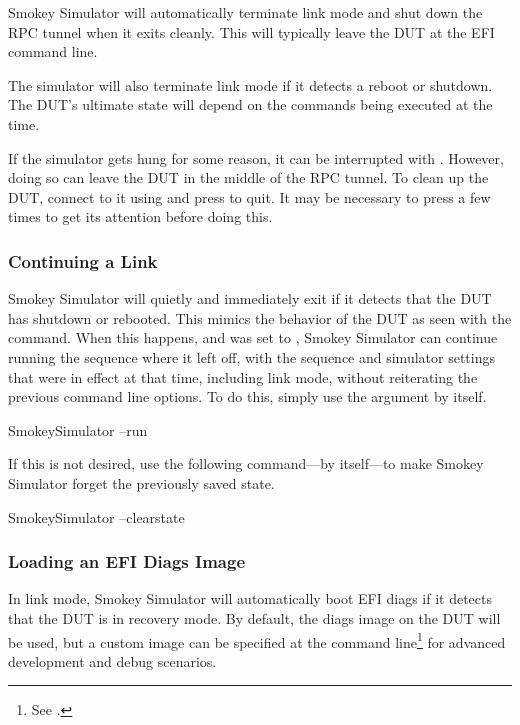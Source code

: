 Smokey Simulator will automatically terminate link mode and shut down the RPC
tunnel when it exits cleanly.  This will typically leave the DUT at the EFI
command line.

The simulator will also terminate link mode if it detects a reboot or shutdown.
The DUT's ultimate state will depend on the commands being executed at the
time.

If the simulator gets hung for some reason, it can be interrupted with
\KeyCapsCtrlC{}.  However, doing so can leave the DUT in the middle of the RPC
tunnel.  To clean up the DUT, connect to it using  and press
\KeyCapsCtrlD{} to quit.  It may be necessary to press \KeyCapsEnter{} a few
times to get its attention before doing this.

\subsubsection{Continuing a Link}

Smokey Simulator will quietly and immediately exit if it detects that the DUT
has shutdown or rebooted.  This mimics the behavior of the DUT as seen with the
 command.  When this happens, and  was
set to , Smokey Simulator can continue running the sequence
where it left off, with the sequence and simulator settings that were in effect
at that time, including link mode, without reiterating the previous command
line options.  To do this, simply use the  argument by itself.

\begin{CommandLine}
SmokeySimulator --run
\end{CommandLine}

If this is not desired, use the following command---by itself---to make Smokey
Simulator forget the previously saved state.

\begin{CommandLine}
SmokeySimulator --clearstate
\end{CommandLine}

\subsubsection{Loading an EFI Diags Image}

In link mode, Smokey Simulator will automatically boot EFI diags if it detects
that the DUT is in recovery mode.  By default, the diags image on the DUT will
be used, but a custom image can be specified at the command line\footnote{See
.} for advanced development and debug scenarios.

